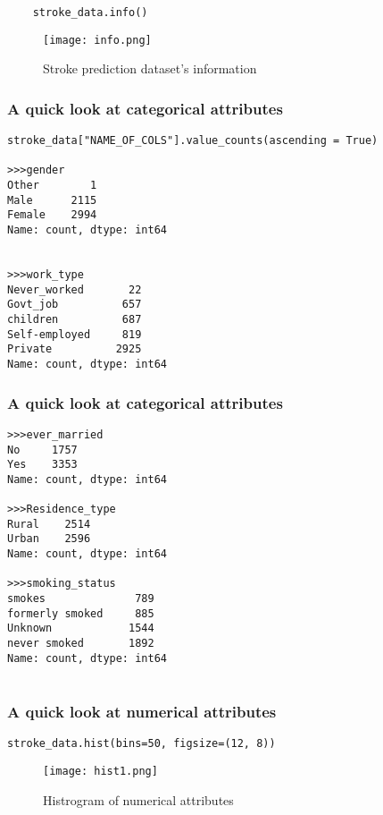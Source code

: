 \documentclass[10pt]{beamer}
\theoremstyle{definition}
\theoremstyle{remark}
\numberwithin{equation}{section}
\begin{document}
\begin{frame}[fragile]
\begin{lstlisting}
	stroke_data.info()
\end{lstlisting}
	
	\begin{figure}[h]
		\caption{Stroke prediction dataset's information}
		\centering
		\texttt{[image: info.png]}
	\end{figure}
	
\end{frame}



\begin{frame}[fragile]
	\frametitle{A quick look at categorical attributes}
\begin{lstlisting}
stroke_data["NAME_OF_COLS"].value_counts(ascending = True)

>>>gender
Other        1
Male      2115
Female    2994
Name: count, dtype: int64


>>>work_type
Never_worked       22
Govt_job          657
children          687
Self-employed     819
Private          2925
Name: count, dtype: int64
\end{lstlisting}
	
\end{frame}


\begin{frame}[fragile]
	\frametitle{A quick look at categorical attributes}
	\begin{lstlisting}
>>>ever_married
No     1757
Yes    3353
Name: count, dtype: int64
	
>>>Residence_type
Rural    2514
Urban    2596
Name: count, dtype: int64
	
>>>smoking_status
smokes              789
formerly smoked     885
Unknown            1544
never smoked       1892
Name: count, dtype: int64
	
	\end{lstlisting}
	
\end{frame}



\begin{frame}[fragile]
	\frametitle{A quick look at numerical attributes}
\begin{lstlisting}
stroke_data.hist(bins=50, figsize=(12, 8))	\end{lstlisting}
	
	\begin{figure}[h]
		\caption{Histrogram of numerical attributes }
		\centering
		\texttt{[image: hist1.png]}
	\end{figure}
	
\end{frame}
\end{document}
